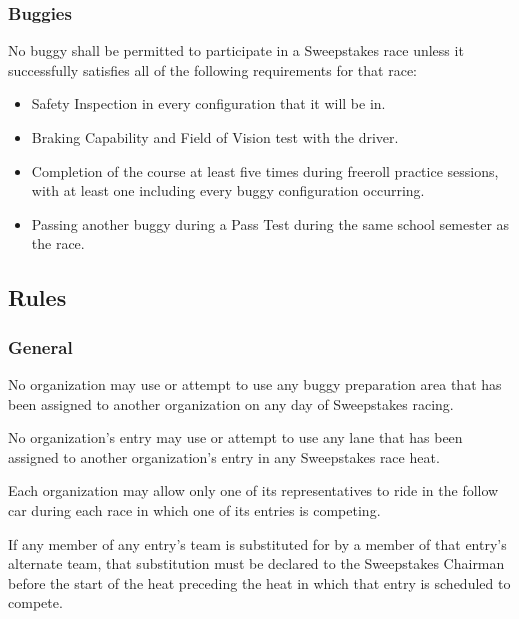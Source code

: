 \subsubsection{Buggies}

	No buggy shall be permitted to participate in a Sweepstakes race unless it
	successfully satisfies all of the following requirements for that race:

	\begin{itemize}

		\item Safety Inspection in every configuration that it will be in.

		\item Braking Capability and Field of Vision test with the driver.
		
		\item Completion of the course at least five times during freeroll practice 
		sessions, with at least one including every buggy configuration occurring.

		\item Passing another buggy during a Pass Test during the same school 
		semester as the race.

	\end{itemize}

\subsection{Rules}

\subsubsection{General}

	No organization may use or attempt to use any buggy preparation area that has
	been assigned to another organization on any day of Sweepstakes racing.

	No organization's entry may use or attempt to use any lane that has been
	assigned to another organization's entry in any Sweepstakes race heat.

	Each organization may allow only one of its representatives to ride in the
	follow car during each race in which one of its entries is competing.

	If any member of any entry's team is substituted for by a member of that
	entry's alternate team, that substitution must be declared to the Sweepstakes
	Chairman before the start of the heat preceding the heat in which that entry is
	scheduled to compete.

